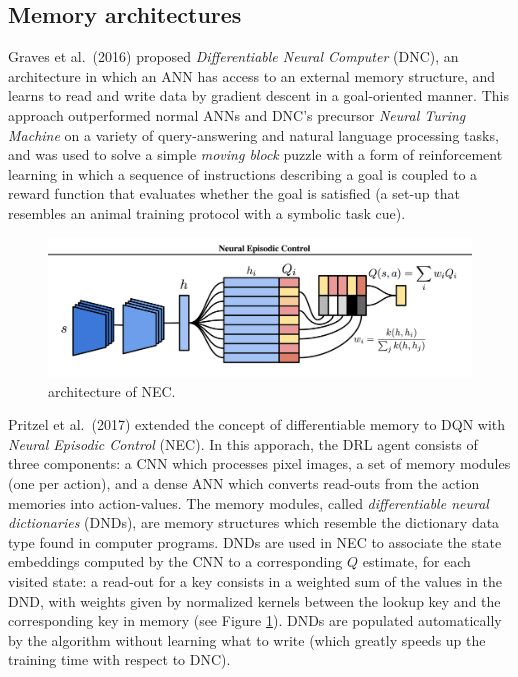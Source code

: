 \subsection{Memory architectures}
Graves et al.\ (2016) \cite{graves2016hybrid} proposed \textit{Differentiable 
Neural Computer} (DNC), an architecture in which an ANN has access to an 
external memory structure, and learns to read and write data by gradient descent
in a goal-oriented manner.
This approach outperformed normal ANNs and DNC's precursor \textit{Neural 
Turing Machine} \cite{gravesneural} on a variety of query-answering and natural 
language processing tasks, and was used to solve a simple \textit{moving block} 
puzzle with a form of reinforcement learning in which a sequence of instructions
describing a goal is coupled to a reward function that evaluates whether the 
goal is satisfied (a set-up that resembles an animal training protocol with a 
symbolic task cue).
%
\begin{figure}[h]
\includegraphics[width=\textwidth]{pictures/nec}
\centering
\caption{architecture of NEC.}
\label{i:nec}
\end{figure}
%

Pritzel et al.\ (2017) \cite{pritzel2017neural} extended the concept of 
differentiable memory to DQN with \textit{Neural Episodic Control} (NEC). 
In this apporach, the DRL agent consists of three components: a CNN which 
processes pixel images, a set of memory modules (one per action), and a dense 
ANN which converts read-outs from the action memories into action-values. The 
memory modules, called \textit{differentiable neural dictionaries} (DNDs), are 
memory structures which resemble the dictionary data type found in computer 
programs. DNDs are used in NEC to associate the state embeddings computed by the
CNN to a corresponding $Q$ estimate, for each visited state: a read-out for a 
key consists in a weighted sum of the values in the DND, with weights given by 
normalized kernels between the lookup key and the corresponding key in memory 
(see Figure \ref{i:nec}). 
DNDs are populated automatically by the algorithm without learning what to write
(which greatly speeds up the training time with respect to DNC).

